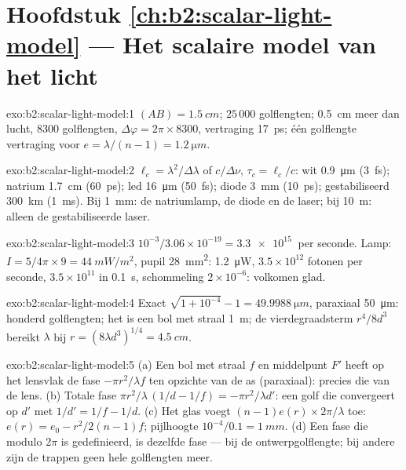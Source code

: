 \section*{Hoofdstuk \ref{ch:b2:scalar-light-model} --- Het scalaire model
van het licht}

\begin{solution}{exo:b2:scalar-light-model:1}
$(AB) = \qty{1.5}{cm}$; $25\,000$ golflengten; \qty{0.5}{cm} meer dan lucht,
$8300$ golflengten, $\Delta\varphi = 2\pi \times 8300$, vertraging
\qty{17}{ps}; één golflengte vertraging voor
$e = \lambda/(n - 1) = \qty{1.2}{\micro m}$.
\end{solution}

\begin{solution}{exo:b2:scalar-light-model:2}
$\ell_c = \lambda^2/\Delta\lambda$ of $c/\Delta\nu$, $\tau_c = \ell_c/c$:
wit \qty{0.9}{\micro m} (\qty{3}{fs}); natrium \qty{1.7}{cm} (\qty{60}{ps});
led \qty{16}{\micro m} (\qty{50}{fs}); diode \qty{3}{mm} (\qty{10}{ps});
gestabiliseerd \qty{300}{km} (\qty{1}{ms}). Bij \qty{1}{mm}: de natriumlamp,
de diode en de laser; bij \qty{10}{m}: alleen de gestabiliseerde laser.
\end{solution}

\begin{solution}{exo:b2:scalar-light-model:3}
$10^{-3}/3.06 \times 10^{-19} = \qty{3.3e15}{}$ per seconde. Lamp:
$I = 5/4\pi \times 9 =
\qty{44}{mW/m^2}$, pupil \qty{28}{mm^2}:
\qty{1.2}{\micro W}, $3.5 \times 10^{12}$ fotonen per seconde,
$3.5 \times 10^{11}$ in \qty{0.1}{s}, schommeling $2 \times 10^{-6}$:
volkomen glad.
\end{solution}

\begin{solution}{exo:b2:scalar-light-model:4}
Exact $\sqrt{1 + 10^{-4}} - 1 = \qty{49.9988}{\micro m}$, paraxiaal
\qty{50}{\micro m}: honderd golflengten; het  is een bol met straal
\qty{1}{m}; de vierdegraadsterm $r^4/8d^3$ bereikt $\lambda$ bij
$r = (8\lambda d^3)^{1/4} = \qty{4.5}{cm}$.
\end{solution}

\begin{solution}{exo:b2:scalar-light-model:5}
(a) Een bol met straal $f$ en middelpunt $F'$ heeft op het lensvlak de fase
$-\pi r^2/\lambda f$ ten opzichte van de as (paraxiaal): precies die van de
lens. (b) Totale fase $\pi r^2/\lambda\,(1/d - 1/f) = -\pi r^2/\lambda d'$:
een golf die convergeert op $d'$ met $1/d' = 1/f - 1/d$. (c) Het glas voegt
$(n - 1)e(r)
\times2\pi/\lambda$ toe: $e(r) = e_0 - r^2/2(n - 1)f$;
pijlhoogte $10^{-4}/0.1 = \qty{1}{mm}$. (d) Een fase die modulo $2\pi$ is
gedefinieerd, is dezelfde fase --- bij de ontwerpgolflengte; bij andere zijn
de trappen geen hele golflengten meer.
\end{solution}

